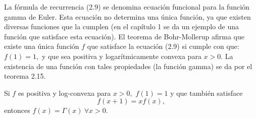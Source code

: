 La fórmula de recurrencia (2.9) se denomina ecuación funcional para la función gamma de Euler. Esta ecuación no determina una única función, ya que existen diversas funciones que la cumplen (en el capítulo 1 se da un ejemplo de una función que satisface esta ecuación). El teorema de Bohr-Mollerup afirma que existe una única función $f$ que satisface la ecuación (2.9) si cumple con que: $f(1) = 1,$ y que sea positiva y logarítmicamente convexa para $x > 0.$ La existencia de una función con tales propiedades (la función gamma) se da por el teorema 2.15.
\begin{theorem}
	Si $f$ es positiva y log-convexa para $x > 0,$ $f(1) = 1$ y que también satisface
	\begin{equation}
	f(x+1) = x f(x),
	\end{equation}
	entonces $f(x) = \Gamma(x)\ \forall x > 0.$
\end{theorem}
